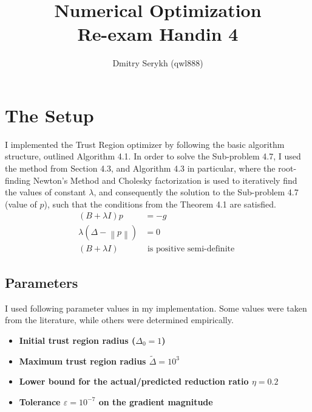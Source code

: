 \documentclass[a4paper]{article}
\title{\vspace{-5cm} Numerical Optimization \\ Re-exam Handin 4}
\author{Dmitry Serykh (qwl888)}
\begin{document}
\maketitle
\section{The Setup}
I implemented the Trust Region optimizer by following the basic algorithm
structure, outlined Algorithm 4.1. In order to solve the Sub-problem 4.7, I used
the method from Section 4.3, and Algorithm 4.3 in particular, where the root-finding Newton's
Method and Cholesky factorization is used to iteratively find the values of
constant $\lambda$, and consequently the solution to the Sub-problem 4.7 (value
of $p$), such that the conditions from the Theorem 4.1 are satisfied.
\[
\begin{aligned}(B+\lambda I) p &=-g \\ \lambda\left(\Delta-\left\|p\right\|\right) &=0 \\(B+\lambda I) & \text { is positive semi-definite } \end{aligned}
\]

\subsection{Parameters}
I used following parameter values in my implementation. Some values were taken
from the literature, while others were determined empirically.
\begin{itemize}
\item \textbf{Initial trust region radius ($\Delta_0 = 1$)}
\item \textbf{Maximum trust region radius $\tilde{\Delta}=10^3$}
\item \textbf{Lower bound for the actual/predicted reduction ratio $\eta=0.2$}
\item \textbf{Tolerance $\varepsilon = 10^{-7}$ on the gradient magnitude}
\end{itemize}
\end{document}
